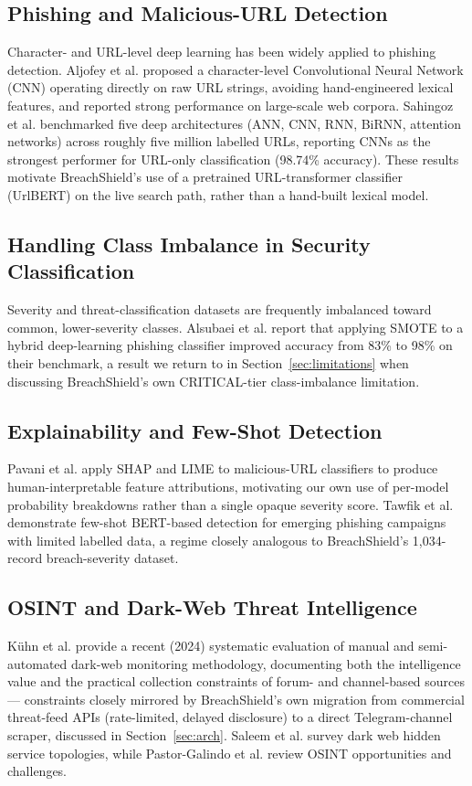 \documentclass[conference]{IEEEtran}
\begin{document}
\subsection{Phishing and Malicious-URL Detection}
Character- and URL-level deep learning has been widely applied to phishing detection. Aljofey et al. \cite{aljofey2020effective} proposed a character-level Convolutional Neural Network (CNN) operating directly on raw URL strings, avoiding hand-engineered lexical features, and reported strong performance on large-scale web corpora. Sahingoz et al. \cite{sahingoz2024dephides} benchmarked five deep architectures (ANN, CNN, RNN, BiRNN, attention networks) across roughly five million labelled URLs, reporting CNNs as the strongest performer for URL-only classification (98.74\% accuracy). These results motivate BreachShield's use of a pretrained URL-transformer classifier (UrlBERT) on the live search path, rather than a hand-built lexical model.

\subsection{Handling Class Imbalance in Security Classification}
Severity and threat-classification datasets are frequently imbalanced toward common, lower-severity classes. Alsubaei et al. \cite{alsubaei2024enhancing} report that applying SMOTE to a hybrid deep-learning phishing classifier improved accuracy from 83\% to 98\% on their benchmark, a result we return to in Section~\ref{sec:limitations} when discussing BreachShield's own CRITICAL-tier class-imbalance limitation.

\subsection{Explainability and Few-Shot Detection}
Pavani et al. \cite{pavani2024enhancing} apply SHAP and LIME to malicious-URL classifiers to produce human-interpretable feature attributions, motivating our own use of per-model probability breakdowns rather than a single opaque severity score. Tawfik et al. \cite{tawfik2025explainable} demonstrate few-shot BERT-based detection for emerging phishing campaigns with limited labelled data, a regime closely analogous to BreachShield's 1,034-record breach-severity dataset.

\subsection{OSINT and Dark-Web Threat Intelligence}
K\"uhn et al. \cite{kuhn2024navigating} provide a recent (2024) systematic evaluation of manual and semi-automated dark-web monitoring methodology, documenting both the intelligence value and the practical collection constraints of forum- and channel-based sources --- constraints closely mirrored by BreachShield's own migration from commercial threat-feed APIs (rate-limited, delayed disclosure) to a direct Telegram-channel scraper, discussed in Section~\ref{sec:arch}. Saleem et al. \cite{saleem2022anonymity} survey dark web hidden service topologies, while Pastor-Galindo et al. \cite{pastor2020not} review OSINT opportunities and challenges.
\end{document}
